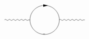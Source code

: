 \[\begin{gathered}
\begin{tikzpicture}[x=0.75pt,y=0.75pt,yscale=-0.75,xscale=0.75]
            \draw    (138.71,174.48) .. controls (140.38,172.81) and (142.04,172.81) .. (143.71,174.48) .. controls (145.38,176.15) and (147.04,176.15) .. (148.71,174.48) .. controls (150.38,172.81) and (152.04,172.81) .. (153.71,174.48) .. controls (155.38,176.15) and (157.04,176.15) .. (158.71,174.48) .. controls (160.38,172.81) and (162.04,172.81) .. (163.71,174.48) .. controls (165.38,176.15) and (167.04,176.15) .. (168.71,174.48) .. controls (170.38,172.81) and (172.04,172.81) .. (173.71,174.48) .. controls (175.38,176.15) and (177.04,176.15) .. (178.71,174.48) .. controls (180.38,172.81) and (182.04,172.81) .. (183.71,174.48) .. controls (185.38,176.15) and (187.04,176.15) .. (188.71,174.48) .. controls (190.38,172.81) and (192.04,172.81) .. (193.71,174.48) .. controls (195.38,176.15) and (197.04,176.15) .. (198.71,174.48) -- (202.71,174.48) -- (202.71,174.48) ;
            \draw   (202.71,174.48) .. controls (202.71,154.13) and (219.21,137.63) .. (239.56,137.63) .. controls (259.91,137.63) and (276.41,154.13) .. (276.41,174.48) .. controls (276.41,194.84) and (259.91,211.34) .. (239.56,211.34) .. controls (219.21,211.34) and (202.71,194.84) .. (202.71,174.48) -- cycle ;
            \draw    (276.41,174.48) .. controls (278.08,172.81) and (279.74,172.81) .. (281.41,174.48) .. controls (283.08,176.15) and (284.74,176.15) .. (286.41,174.48) .. controls (288.08,172.81) and (289.74,172.81) .. (291.41,174.48) .. controls (293.08,176.15) and (294.74,176.15) .. (296.41,174.48) .. controls (298.08,172.81) and (299.74,172.81) .. (301.41,174.48) .. controls (303.08,176.15) and (304.74,176.15) .. (306.41,174.48) .. controls (308.08,172.81) and (309.74,172.81) .. (311.41,174.48) .. controls (313.08,176.15) and (314.74,176.15) .. (316.41,174.48) .. controls (318.08,172.81) and (319.74,172.81) .. (321.41,174.48) .. controls (323.08,176.15) and (324.74,176.15) .. (326.41,174.48) .. controls (328.08,172.81) and (329.74,172.81) .. (331.41,174.48) .. controls (333.08,176.15) and (334.74,176.15) .. (336.41,174.48) -- (340.41,174.48) -- (340.41,174.48) ;
            \draw    (248,138) ;
            \draw [shift={(248,138)}, rotate = 180] [fill={rgb, 255:red, 0; green, 0; blue, 0 }  ][line width=0.08]  [draw opacity=0] (12,-3) -- (0,0) -- (12,3) -- cycle    ;
            \draw    (240.56,210.34) -- (235.26,210.34) ;

\end{tikzpicture}
\end{gathered}\]
